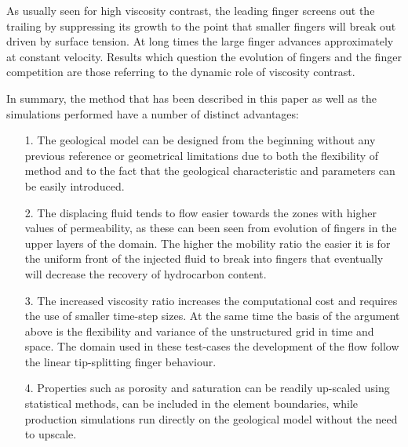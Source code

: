 \documentclass[preprint,authoryear,12pt]{elsarticle}
\begin{document}
\medskip
As usually seen for high viscosity contrast, the leading finger screens out the trailing by suppressing its growth to the point that smaller fingers will break out driven by surface tension. At long times the large finger advances approximately at
constant velocity. Results which question the evolution of fingers and the finger competition are those referring to the dynamic role of viscosity contrast.

\medskip
In summary, the method that has been described in this paper as well as the simulations performed have a number of distinct advantages: 
\begin{enumerate}
\item[1.] The geological model can be designed from the beginning without any previous reference or geometrical limitations due to both the flexibility of method and to the fact that the geological characteristic and parameters can be easily introduced.

\item[2.] The displacing fluid tends to flow easier towards the zones with higher values of permeability, as these can been seen from evolution of fingers in the upper layers of the domain. The higher the mobility ratio the easier it is for the uniform front of the injected fluid to break into fingers that eventually will decrease the recovery of hydrocarbon content.
\item[3.] The increased viscosity ratio increases the computational cost and requires the use of smaller time-step sizes. At the same time the basis of the argument above is the flexibility and variance of the unstructured grid in time and space. The domain used in these test-cases the development of the flow follow the linear tip-splitting finger behaviour.
\item[4.] Properties such as porosity and saturation can be readily up-scaled using statistical methods, can be included in the element boundaries,  while production simulations run directly on the geological model without the need to upscale.
\end{enumerate}
\end{document}
